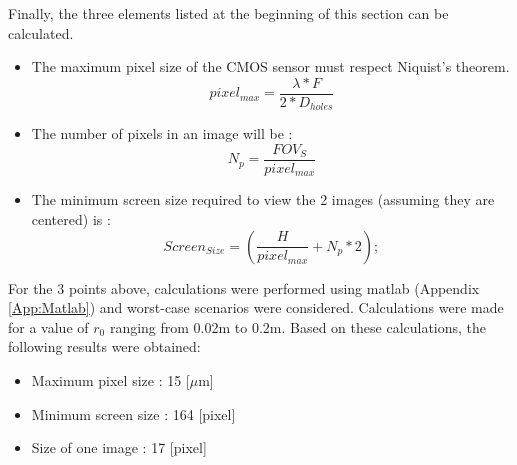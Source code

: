\newpage
Finally, the three elements listed at the beginning of this section can be calculated.
\begin{itemize}
    \item The maximum pixel size of the CMOS sensor must respect Niquist's theorem.
          \begin{equation}
              pixel_{max} = \frac{\lambda*F}{2*D_{holes}}
          \end{equation}
    \item The number of pixels in an image will be :
          \begin{equation}
              N_{p} = \frac{FOV_S}{pixel_{max}}
          \end{equation}
    \item The minimum screen size required to view the 2 images (assuming they are centered) is :
          \begin{equation}
              Screen_{Size} = (\frac{H}{pixel_{max}}+ N_{p}*2);
          \end{equation}
\end{itemize}
For the 3 points above, calculations were performed using matlab (Appendix \ref{App:Matlab}) and worst-case scenarios
were considered. Calculations were made for a value of $r_0$ ranging from 0.02m to 0.2m.
Based on these calculations, the following results were obtained:
\begin{itemize}
    \item Maximum pixel size : 15 [$\mu$m]
    \item Minimum screen size : 164 [pixel]
    \item Size of one image : 17 [pixel]
\end{itemize}
